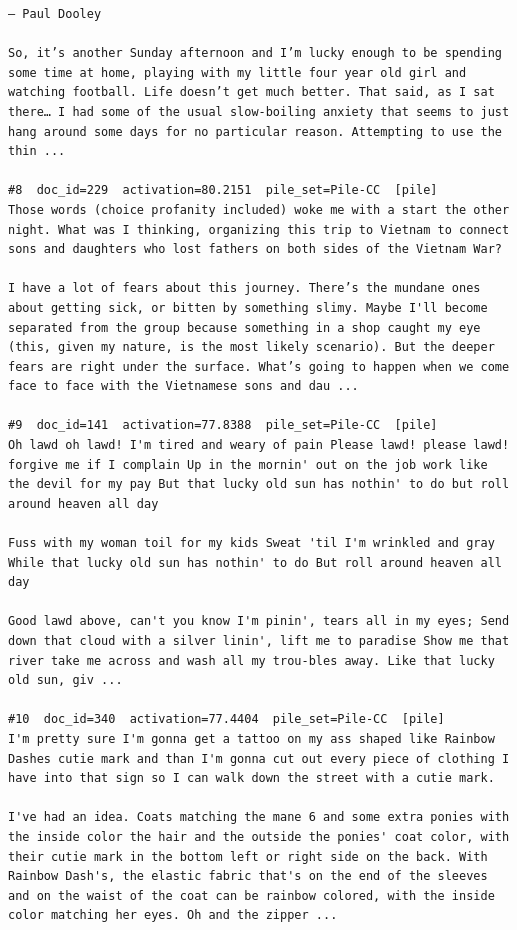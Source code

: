 \begin{verbatim}
— Paul Dooley

So, it’s another Sunday afternoon and I’m lucky enough to be spending some time at home, playing with my little four year old girl and watching football. Life doesn’t get much better. That said, as I sat there… I had some of the usual slow-boiling anxiety that seems to just hang around some days for no particular reason. Attempting to use the thin ...

#8  doc_id=229  activation=80.2151  pile_set=Pile-CC  [pile]
Those words (choice profanity included) woke me with a start the other night. What was I thinking, organizing this trip to Vietnam to connect sons and daughters who lost fathers on both sides of the Vietnam War?

I have a lot of fears about this journey. There’s the mundane ones about getting sick, or bitten by something slimy. Maybe I'll become separated from the group because something in a shop caught my eye (this, given my nature, is the most likely scenario). But the deeper fears are right under the surface. What’s going to happen when we come face to face with the Vietnamese sons and dau ...

#9  doc_id=141  activation=77.8388  pile_set=Pile-CC  [pile]
Oh lawd oh lawd! I'm tired and weary of pain Please lawd! please lawd! forgive me if I complain Up in the mornin' out on the job work like the devil for my pay But that lucky old sun has nothin' to do but roll around heaven all day

Fuss with my woman toil for my kids Sweat 'til I'm wrinkled and gray While that lucky old sun has nothin' to do But roll around heaven all day

Good lawd above, can't you know I'm pinin', tears all in my eyes; Send down that cloud with a silver linin', lift me to paradise Show me that river take me across and wash all my trou-bles away. Like that lucky old sun, giv ...

#10  doc_id=340  activation=77.4404  pile_set=Pile-CC  [pile]
I'm pretty sure I'm gonna get a tattoo on my ass shaped like Rainbow Dashes cutie mark and than I'm gonna cut out every piece of clothing I have into that sign so I can walk down the street with a cutie mark.

I've had an idea. Coats matching the mane 6 and some extra ponies with the inside color the hair and the outside the ponies' coat color, with their cutie mark in the bottom left or right side on the back. With Rainbow Dash's, the elastic fabric that's on the end of the sleeves and on the waist of the coat can be rainbow colored, with the inside color matching her eyes. Oh and the zipper ...


\end{verbatim}
